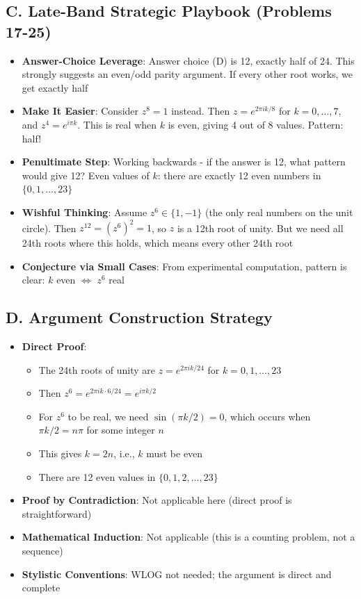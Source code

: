 \documentclass[]{article}
\begin{document}
\begin{strategicbox}
\subsection*{C. Late-Band Strategic Playbook (Problems 17-25)}
\begin{itemize}[leftmargin=*]
    \item \textbf{Answer-Choice Leverage}: Answer choice (D) is 12, exactly half of 24. This strongly suggests an even/odd parity argument. If every other root works, we get exactly half
    \item \textbf{Make It Easier}: Consider $z^8 = 1$ instead. Then $z = e^{2\pi i k/8}$ for $k=0,\ldots,7$, and $z^4 = e^{i\pi k}$. This is real when $k$ is even, giving 4 out of 8 values. Pattern: half!
    \item \textbf{Penultimate Step}: Working backwards - if the answer is 12, what pattern would give 12? Even values of $k$: there are exactly 12 even numbers in $\{0,1,\ldots,23\}$
    \item \textbf{Wishful Thinking}: Assume $z^6 \in \{1, -1\}$ (the only real numbers on the unit circle). Then $z^{12} = (z^6)^2 = 1$, so $z$ is a 12th root of unity. But we need all 24th roots where this holds, which means every other 24th root
    \item \textbf{Conjecture via Small Cases}: From experimental computation, pattern is clear: $k$ even $\Leftrightarrow$ $z^6$ real
\end{itemize}

\subsection*{D. Argument Construction Strategy}
\begin{itemize}[leftmargin=*]
    \item \textbf{Direct Proof}: 
    \begin{itemize}
        \item The 24th roots of unity are $z = e^{2\pi i k/24}$ for $k = 0, 1, \ldots, 23$
        \item Then $z^6 = e^{2\pi i k \cdot 6/24} = e^{i\pi k/2}$
        \item For $z^6$ to be real, we need $\sin(\pi k/2) = 0$, which occurs when $\pi k/2 = n\pi$ for some integer $n$
        \item This gives $k = 2n$, i.e., $k$ must be even
        \item There are 12 even values in $\{0, 1, 2, \ldots, 23\}$
    \end{itemize}
    \item \textbf{Proof by Contradiction}: Not applicable here (direct proof is straightforward)
    \item \textbf{Mathematical Induction}: Not applicable (this is a counting problem, not a sequence)
    \item \textbf{Stylistic Conventions}: WLOG not needed; the argument is direct and complete
\end{itemize}


\end{strategicbox}
\end{document}

